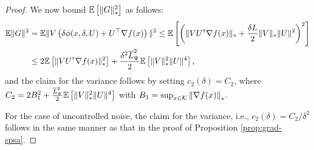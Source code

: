 \begin{proof}
We now bound $\mathbb{E}\left[ \|G\|_*^2\right]$ as follows:
\begin{align*}
 \mathbb{E} \|G\|^2
& = \mathbb{E}\|V\left(\delta \phi(x,\delta, U)+ U^\top\nabla f(x) \right)\|^2
 \le  \mathbb{E}\left[ \left( \| V U ^\mathsf{\scriptscriptstyle T} \nabla f(x)\|_* + \frac{\delta L}{2} \|V\|_* \|U\|^2 \right)^2\right]\\
& \le  2 \mathbb{E}\left[  \| V U ^\mathsf{\scriptscriptstyle T} \nabla f(x)\|_*^2\right]  + \frac{\delta^2 \overline{L}_{\Psi}^2}{2}\mathbb{E}\left[ \|V\|_*^2 \|U\|^4 \right],
\end{align*}
and the claim for the variance follows by setting $c_2(\delta) = C_2$,
where $C_2 =  2 B_1^2  + \frac{ \overline{L}_{\Psi}^2}{2}\mathbb{E}\left[ \|V\|_*^2 \|U\|^4 \right]$ with $B_1 = \sup_{x\in \mathcal{K}} \left\|\nabla f(x)\right\|_*$.

For the case of uncontrolled noise, the claim for the variance, i.e., $c_2(\delta) = C_2/\delta^2$ follows in the same manner as that in the proof of Proposition \ref{prop:grad-spsa}.
\end{proof}


